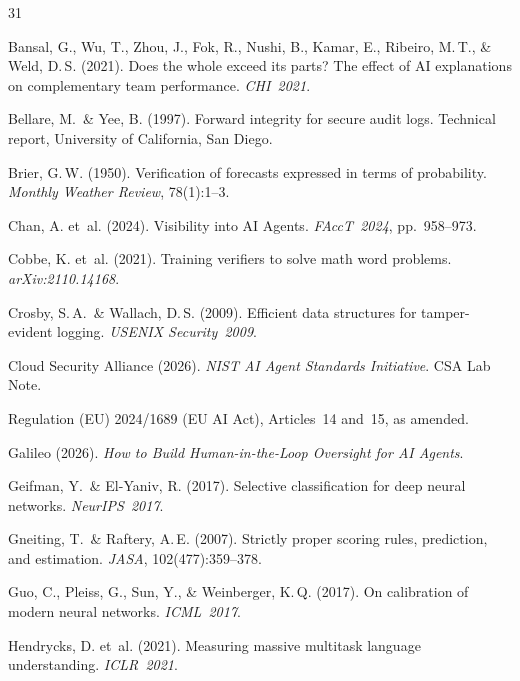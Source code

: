 \documentclass[10pt,twocolumn]{article}
\begin{document}
\balance
\begin{thebibliography}{31}\small\raggedright

Bansal, G., Wu, T., Zhou, J., Fok, R., Nushi, B., Kamar, E., Ribeiro, M.\,T.,
\& Weld, D.\,S. (2021). Does the whole exceed its parts? The effect of AI
explanations on complementary team performance. \textit{CHI~2021}.

Bellare, M.\ \& Yee, B. (1997). Forward integrity for secure audit logs.
Technical report, University of California, San Diego.

Brier, G.\,W. (1950). Verification of forecasts expressed in terms of probability.
\textit{Monthly Weather Review}, 78(1):1--3.

Chan, A. et~al. (2024). Visibility into AI Agents. \textit{FAccT~2024},
pp.~958--973.

Cobbe, K. et~al. (2021). Training verifiers to solve math word problems.
\textit{arXiv:2110.14168}.

Crosby, S.\,A.\ \& Wallach, D.\,S. (2009). Efficient data structures for
tamper-evident logging. \textit{USENIX Security~2009}.

Cloud Security Alliance (2026). \textit{NIST AI Agent Standards Initiative}.
CSA Lab Note.

Regulation (EU) 2024/1689 (EU AI Act), Articles~14 and~15, as amended.

Galileo (2026). \textit{How to Build Human-in-the-Loop Oversight for AI Agents}.

Geifman, Y.\ \& El-Yaniv, R. (2017). Selective classification for deep neural
networks. \textit{NeurIPS~2017}.

Gneiting, T.\ \& Raftery, A.\,E. (2007). Strictly proper scoring rules,
prediction, and estimation. \textit{JASA}, 102(477):359--378.

Guo, C., Pleiss, G., Sun, Y., \& Weinberger, K.\,Q. (2017). On calibration of
modern neural networks. \textit{ICML~2017}.

Hendrycks, D. et~al. (2021). Measuring massive multitask language understanding.
\textit{ICLR~2021}.


\end{thebibliography}
\end{document}
